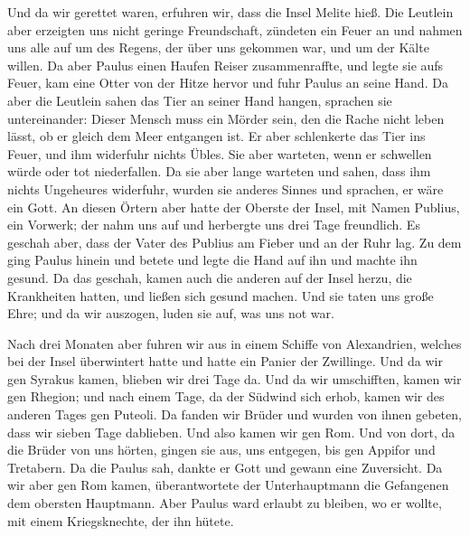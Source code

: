  Und da wir gerettet waren, erfuhren wir, dass die Insel
Melite hieß.  Die Leutlein aber erzeigten uns nicht
geringe Freundschaft, zündeten ein Feuer an und nahmen uns alle auf um
des Regens, der über uns gekommen war, und um der Kälte willen.
 Da aber Paulus einen Haufen Reiser zusammenraffte, und
legte sie aufs Feuer, kam eine Otter von der Hitze hervor und fuhr
Paulus an seine Hand.  Da aber die Leutlein sahen das Tier
an seiner Hand hangen, sprachen sie untereinander: Dieser Mensch muss
ein Mörder sein, den die Rache nicht leben lässt, ob er gleich dem Meer
entgangen ist.  Er aber schlenkerte das Tier ins Feuer,
und ihm widerfuhr nichts Übles.  Sie aber warteten, wenn
er schwellen würde oder tot niederfallen. Da sie aber lange warteten und
sahen, dass ihm nichts Ungeheures widerfuhr, wurden sie anderes Sinnes
und sprachen, er wäre ein Gott.  An diesen Örtern aber
hatte der Oberste der Insel, mit Namen Publius, ein Vorwerk; der nahm
uns auf und herbergte uns drei Tage freundlich.  Es
geschah aber, dass der Vater des Publius am Fieber und an der Ruhr lag.
Zu dem ging Paulus hinein und betete und legte die Hand auf ihn und
machte ihn gesund.  Da das geschah, kamen auch die anderen
auf der Insel herzu, die Krankheiten hatten, und ließen sich gesund
machen.  Und sie taten uns große Ehre; und da wir
auszogen, luden sie auf, was uns not war.

 Nach drei Monaten aber fuhren wir aus in einem Schiffe
von Alexandrien, welches bei der Insel überwintert hatte und hatte ein
Panier der Zwillinge.  Und da wir gen Syrakus kamen,
blieben wir drei Tage da.  Und da wir umschifften, kamen
wir gen Rhegion; und nach einem Tage, da der Südwind sich erhob, kamen
wir des anderen Tages gen Puteoli.  Da fanden wir Brüder
und wurden von ihnen gebeten, dass wir sieben Tage dablieben. Und also
kamen wir gen Rom.  Und von dort, da die Brüder von uns
hörten, gingen sie aus, uns entgegen, bis gen Appifor und Tretabern. Da
die Paulus sah, dankte er Gott und gewann eine Zuversicht.
 Da wir aber gen Rom kamen, überantwortete der
Unterhauptmann die Gefangenen dem obersten Hauptmann. Aber Paulus ward
erlaubt zu bleiben, wo er wollte, mit einem Kriegsknechte, der ihn
hütete.

